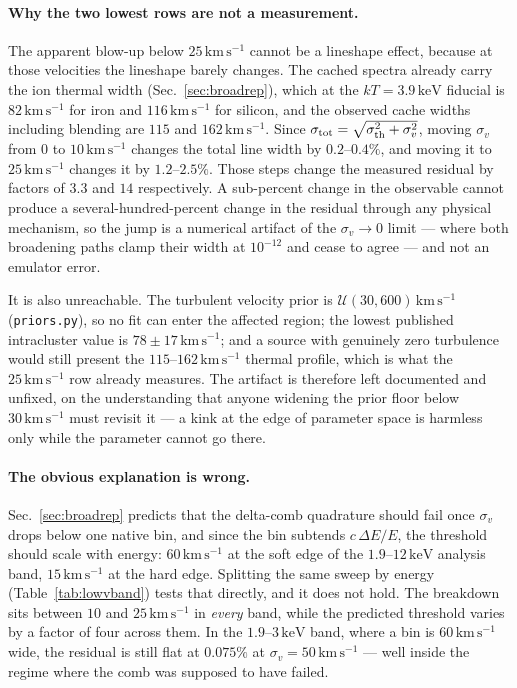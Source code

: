 \documentclass[11pt,a4paper]{article}
\newcommand{\kev}{\,\mathrm{keV}}
\newcommand{\kms}{\,\mathrm{km\,s^{-1}}}
\newcommand{\code}[1]{\texttt{#1}}
\begin{document}
\paragraph{Why the two lowest rows are not a measurement.} The apparent
blow-up below $25\kms$ cannot be a lineshape effect, because at those
velocities the lineshape barely changes. The cached spectra already
carry the ion thermal width (Sec.~\ref{sec:broadrep}), which at the
$kT = 3.9\kev$ fiducial is $82\kms$ for iron and $116\kms$ for silicon,
and the observed cache widths including blending are $115$ and
$162\kms$. Since $\sigma_{\rm tot} = \sqrt{\sigma_{\rm th}^2 +
\sigma_v^2}$, moving $\sigma_v$ from $0$ to $10\kms$ changes the total
line width by $0.2$--$0.4\%$, and moving it to $25\kms$ changes it by
$1.2$--$2.5\%$. Those steps change the measured residual by factors of
$3.3$ and $14$ respectively. A sub-percent change in the observable
cannot produce a several-hundred-percent change in the residual through
any physical mechanism, so the jump is a numerical artifact of the
$\sigma_v \to 0$ limit --- where both broadening paths clamp their width
at $10^{-12}$ and cease to agree --- and not an emulator error.

It is also unreachable. The turbulent velocity prior is
$\mathcal{U}(30, 600)\kms$ (\code{priors.py}), so no fit can enter the
affected region; the lowest published intracluster value is
$78\pm17\kms$; and a source with genuinely zero turbulence would still
present the $115$--$162\kms$ thermal profile, which is what the $25\kms$
row already measures. The artifact is therefore left documented and
unfixed, on the understanding that anyone widening the prior floor below
$30\kms$ must revisit it --- a kink at the edge of parameter space is
harmless only while the parameter cannot go there.

\paragraph{The obvious explanation is wrong.} Sec.~\ref{sec:broadrep}
predicts that the delta-comb quadrature should fail once $\sigma_v$
drops below one native bin, and since the bin subtends $c\,\Delta E/E$,
the threshold should scale with energy: $60\kms$ at the soft edge of the
$1.9$--$12\kev$ analysis band, $15\kms$ at the hard edge. Splitting the
same sweep by energy (Table~\ref{tab:lowvband}) tests that directly, and
it does not hold. The breakdown sits between $10$ and $25\kms$ in
\emph{every} band, while the predicted threshold varies by a factor of
four across them. In the $1.9$--$3\kev$ band, where a bin is $60\kms$
wide, the residual is still flat at $0.075\%$ at $\sigma_v = 50\kms$ ---
well inside the regime where the comb was supposed to have failed.
\end{document}
